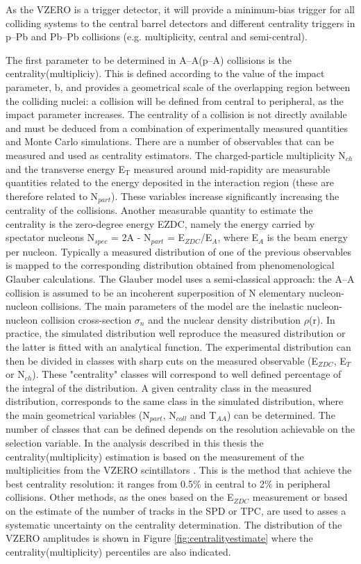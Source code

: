 As the VZERO is a trigger detector, it will provide a minimum-bias trigger for all colliding systems to the central barrel detectors and different centrality triggers in p--Pb and Pb--Pb collisions (e.g. multiplicity, central and semi-central).  

The first parameter to be determined in A--A(p--A) collisions is the centrality(multipliciy). This is defined according to the value of the impact parameter, b, and provides a geometrical scale of the overlapping region between the colliding nuclei: a collision will be defined from central to peripheral, as the impact parameter increases. The centrality of a collision is not directly available and must be deduced from a combination of experimentally measured quantities and Monte Carlo simulations.
There are a number of observables that can be measured and used as centrality estimators. The charged-particle multiplicity N$_{ch}$ and the transverse energy E$_{\mathrm{T}}$ measured around mid-rapidity are measurable quantities related to the energy deposited in the interaction region (these are therefore related to N$_{part}$). These variables increase significantly increasing the centrality of the collisions. Another measurable quantity to estimate the centrality is the zero-degree energy EZDC, namely the energy carried by spectator nucleons N$_{spec}$ = 2A - N$_{part}$ = E$_{ZDC}$/E$_{A}$, where E$_{A}$ is the beam energy per nucleon.
Typically a measured distribution of one of the previous observables is mapped to the corresponding distribution obtained from phenomenological Glauber calculations. The Glauber model \cite{cite:glauber,cite:glauber1} uses a semi-classical approach: the A--A collision is assumed to be an incoherent superposition of N elementary nucleon- nucleon collisions. The main parameters of the model are the inelastic nucleon-nucleon collision cross-section  $\sigma_{n}$ and the nuclear density distribution $\rho$(r). In practice, the simulated distribution well reproduce the measured distribution or the latter is fitted with an analytical function. The experimental distribution can then be divided in classes with sharp cuts on the measured observable (E$_{ZDC}$, E$_{T}$ or N$_{ch}$). These "centrality" classes will correspond to well defined percentage of the integral of the distribution. A given centrality class in the measured distribution, corresponds to the same class in the simulated distribution, where the main geometrical variables (N$_{part}$, N$_{coll}$ and T$_{AA}$) can be determined. The number of classes that can be defined depends on the resolution achievable on the selection variable.
In the analysis described in this thesis the centrality(multiplicity) estimation is based on the measurement of the multiplicities from the VZERO scintillators \cite{cite:centralitypPb}\cite{cite:centralityPbPb}. This is the method that achieve the best centrality resolution: it ranges from 0.5\% in central to 2\% in peripheral collisions. Other methods, as the ones based on the E$_{ZDC}$ measurement or based on the estimate of the number of tracks in the SPD or TPC, are used to asses a systematic uncertainty on the centrality determination.
The distribution of the VZERO amplitudes is shown in Figure \ref{fig:centralityestimate} where the centrality(multiplicity) percentiles are also indicated. 

